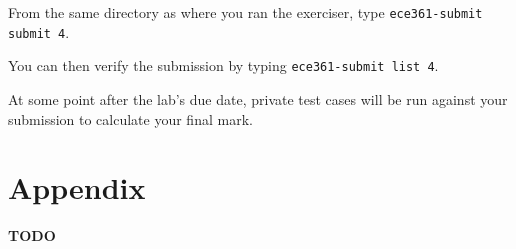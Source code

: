 \documentclass[11pt]{article}
\def\thelab{4}
\begin{document}
From the same directory as where you ran the exerciser, type \texttt{ece361-submit submit \thelab}.

You can then verify the submission by typing \texttt{ece361-submit list \thelab}.

At some point after the lab's due date, private test cases will be run against your submission to calculate your final mark.

\newpage
\appendix
\section{Appendix}
\label{sec:appendix}
\textbf{TODO}
\end{document}
